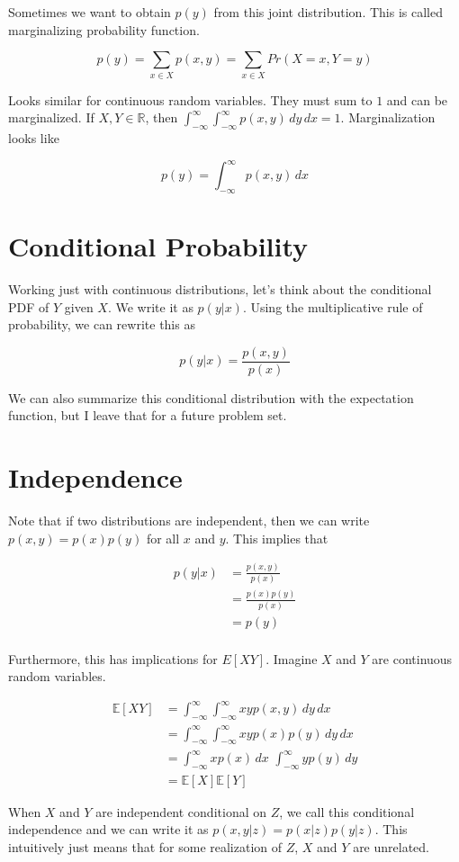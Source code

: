 \documentclass{article} %
\newcommand*\red{\color{red}}  %
\newcommand{\E}{\mathbb{E}}    %
\begin{document}
Sometimes we want to obtain $p(y)$ from this joint distribution. This is called {\red marginalizing} probability function.

\[
p(y) = \sum_{x \in X} p(x, y) = \sum_{x \in X} Pr(X = x, Y = y)
\]

Looks similar for continuous random variables. They must sum to $1$ and can be marginalized. If $X, Y \in \mathbb{R}$, then $\int_{-\infty}^\infty \int_{-\infty}^\infty p(x, y)\,dy\,dx = 1$. Marginalization looks like

\[
p(y) =  \int_{-\infty}^\infty p(x, y)\,dx
\]

\section{Conditional Probability}

Working just with continuous distributions, let's think about the conditional PDF of $Y$ given $X$. We write it as $p(y|x)$. Using the multiplicative rule of probability, we can rewrite this as

\[
p(y|x) = \frac{p(x, y)}{p(x)}
\]

We can also summarize this conditional distribution with the expectation function, but I leave that for a future problem set.

\section{Independence}

Note that if two distributions are {\red independent}, then we can write $p(x, y) = p(x)p(y)$ for all $x$ and $y$. This implies that

\begin{align*}
p(y|x) &= \frac{p(x, y)}{p(x)} \\
&= \frac{p(x)p(y)}{p(x)} \\
&= p(y) \\
\end{align*}

Furthermore, this has implications for $E[XY]$. Imagine $X$ and $Y$ are continuous random variables.

\begin{align*}
\E[XY] &= \int_{-\infty}^\infty \int_{-\infty}^\infty xyp(x,y) \, dy \, dx \\
&= \int_{-\infty}^\infty \int_{-\infty}^\infty xyp(x)p(y) \, dy \, dx \\
&= \int_{-\infty}^\infty xp(x)\, dx\,\, \int_{-\infty}^\infty yp(y) \, dy \\
&= \E[X]\E[Y]
\end{align*}

When $X$ and $Y$ are independent conditional on $Z$, we call this {\red conditional independence} and we can write it as $p(x, y |z) = p(x|z) p(y|z)$. This intuitively just means that for some realization of $Z$, $X$ and $Y$ are unrelated.
\end{document}

